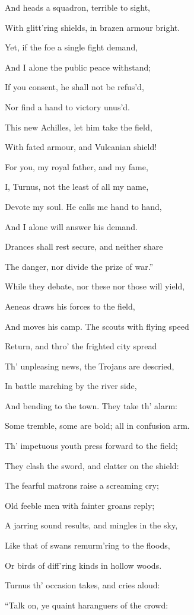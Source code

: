 And heads a squadron, terrible to sight,

With glitt’ring shields, in brazen armour bright.

Yet, if the foe a single fight demand,

And I alone the public peace withstand;

If you consent, he shall not be refus’d,

Nor find a hand to victory unus’d.

This new Achilles, let him take the field,

With fated armour, and Vulcanian shield!

For you, my royal father, and my fame,

I, Turnus, not the least of all my name,

Devote my soul. He calls me hand to hand,

And I alone will answer his demand.

Drances shall rest secure, and neither share

The danger, nor divide the prize of war.”

While they debate, nor these nor those will yield,

Aeneas draws his forces to the field,

And moves his camp. The scouts with flying speed

Return, and thro’ the frighted city spread

Th’ unpleasing news, the Trojans are descried,

In battle marching by the river side,

And bending to the town. They take th’ alarm:

Some tremble, some are bold; all in confusion arm.

Th’ impetuous youth press forward to the field;

They clash the sword, and clatter on the shield:

The fearful matrons raise a screaming cry;

Old feeble men with fainter groans reply;

A jarring sound results, and mingles in the sky,

Like that of swans remurm’ring to the floods,

Or birds of diff’ring kinds in hollow woods.

Turnus th’ occasion takes, and cries aloud:

“Talk on, ye quaint haranguers of the crowd:

